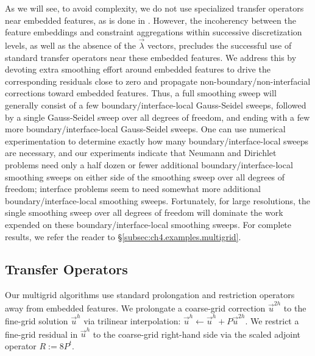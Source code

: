 As we will see, to avoid complexity, we do not use specialized transfer operators near embedded features, as is done in \cite{Adams.Loyce02, Adams.Loyce04, Adams.Loyce05, Chen.Tianbing08, Wan.Justin04}. However, the incoherency between the feature embeddings and constraint aggregations within successive discretization levels, as well as the absence of the $\vec{\lambda}$ vectors, precludes the successful use of standard transfer operators near these embedded features. We address this by devoting extra smoothing effort around embedded features to drive the corresponding residuals close to zero and propagate non-boundary/non-interfacial corrections toward embedded features. Thus, a full smoothing sweep will generally consist of a few boundary/interface-local Gauss-Seidel sweeps, followed by a single Gauss-Seidel sweep over all degrees of freedom, and ending with a few more boundary/interface-local Gauss-Seidel sweeps. One can use numerical experimentation to determine exactly how many boundary/interface-local sweeps are necessary, and our experiments indicate that Neumann and Dirichlet problems need only a half dozen or fewer additional boundary/interface-local smoothing sweeps on either side of the smoothing sweep over all degrees of freedom; interface problems seem to need somewhat more additional boundary/interface-local smoothing sweeps. Fortunately, for large resolutions, the single smoothing sweep over all degrees of freedom will dominate the work expended on these boundary/interface-local smoothing sweeps. For complete results, we refer the reader to \S\ref{subsec:ch4.examples.multigrid}.

\subsection{Transfer Operators} \label{subsec:ch4.multigrid.transferoperators}

Our multigrid algorithms use standard prolongation and restriction operators away from embedded features. We prolongate a coarse-grid correction $\vec{u}^{2h}$ to the fine-grid solution $\vec{u}^h$ via trilinear interpolation: $\vec{u}^h \leftarrow \vec{u}^h + P \vec{u}^{2h}$. We restrict a fine-grid residual in $\vec{u}^h$ to the coarse-grid right-hand side via the scaled adjoint operator $R := 8 P^t$.

